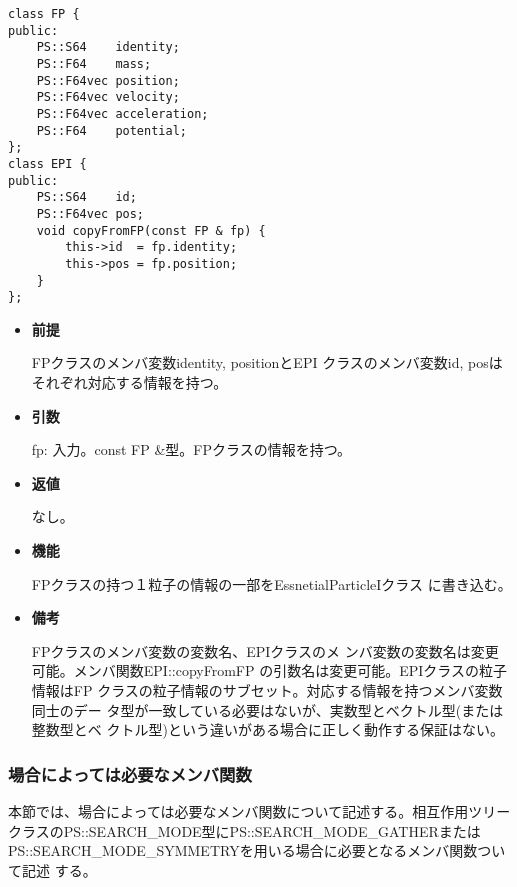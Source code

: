 
\begin{screen}
\begin{verbatim}
class FP {
public:
    PS::S64    identity;
    PS::F64    mass;
    PS::F64vec position;
    PS::F64vec velocity;
    PS::F64vec acceleration;
    PS::F64    potential;
};
class EPI {
public:
    PS::S64    id;
    PS::F64vec pos;
    void copyFromFP(const FP & fp) {
        this->id  = fp.identity;
        this->pos = fp.position;
    }
};
\end{verbatim}
\end{screen}

\begin{itemize}

\item {\bf 前提}

  FPクラスのメンバ変数identity, positionとEPI
  クラスのメンバ変数id, posはそれぞれ対応する情報を持つ。

\item {\bf 引数}

  fp: 入力。const FP \&型。FPクラスの情報を持つ。
  
\item {\bf 返値}

  なし。
  
\item {\bf 機能}

  FPクラスの持つ１粒子の情報の一部をEssnetialParticleIクラス
  に書き込む。
  
\item {\bf 備考}

  FPクラスのメンバ変数の変数名、EPIクラスのメ
  ンバ変数の変数名は変更可能。メンバ関数EPI::copyFromFP
  の引数名は変更可能。EPIクラスの粒子情報はFP
  クラスの粒子情報のサブセット。対応する情報を持つメンバ変数同士のデー
  タ型が一致している必要はないが、実数型とベクトル型(または整数型とベ
  クトル型)という違いがある場合に正しく動作する保証はない。

\end{itemize}

\subsubsection{場合によっては必要なメンバ関数}


本節では、場合によっては必要なメンバ関数について記述する。相互作用ツリー
クラスのPS::SEARCH\_MODE型にPS::SEARCH\_MODE\_GATHERまたは
PS::SEARCH\_MODE\_SYMMETRYを用いる場合に必要となるメンバ関数ついて記述
する。


